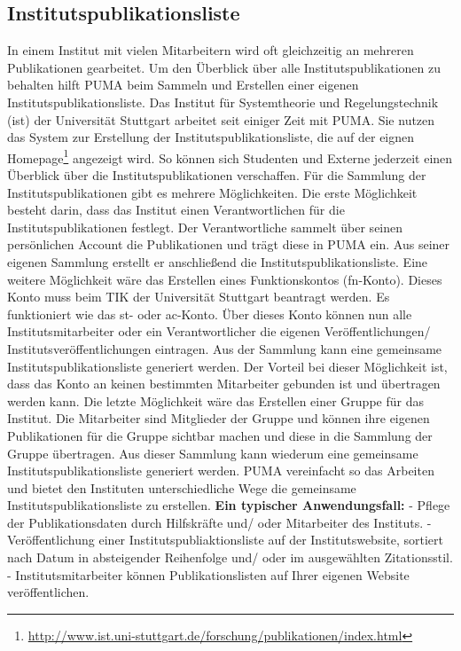 \subsection{Institutspublikationsliste}
In einem Institut mit vielen Mitarbeitern wird oft gleichzeitig an mehreren Publikationen gearbeitet. Um den Überblick über alle Institutspublikationen zu behalten hilft PUMA beim Sammeln und Erstellen einer eigenen Institutspublikationsliste. \newline
Das Institut für Systemtheorie und Regelungstechnik (ist) der Universität Stuttgart arbeitet seit einiger Zeit mit PUMA. Sie nutzen das System zur Erstellung der Institutspublikationsliste, die auf der eignen Homepage\footnote{\url{http://www.ist.uni-stuttgart.de/forschung/publikationen/index.html}} angezeigt wird. So können sich Studenten und Externe jederzeit einen Überblick über die Institutspublikationen verschaffen.\newline
Für die Sammlung der Institutspublikationen gibt es mehrere Möglichkeiten. Die erste Möglichkeit besteht darin, dass das Institut einen Verantwortlichen für  die Institutspublikationen festlegt. Der Verantwortliche sammelt über seinen persönlichen Account die Publikationen und trägt diese in PUMA ein. Aus seiner eigenen Sammlung erstellt er anschließend die Institutspublikationsliste. Eine weitere Möglichkeit wäre das Erstellen eines Funktionskontos (fn-Konto). Dieses Konto muss beim TIK der Universität Stuttgart beantragt werden. Es funktioniert wie das st- oder ac-Konto. Über dieses Konto können nun alle Institutsmitarbeiter oder ein Verantwortlicher die eigenen Veröffentlichungen/ Institutsveröffentlichungen eintragen. Aus der Sammlung kann eine gemeinsame Institutspublikationsliste generiert werden. Der Vorteil bei dieser Möglichkeit ist, dass das Konto an keinen bestimmten Mitarbeiter gebunden ist und übertragen werden kann. Die letzte Möglichkeit wäre das Erstellen einer Gruppe für das Institut. Die Mitarbeiter sind Mitglieder der Gruppe und können ihre eigenen Publikationen für die Gruppe sichtbar machen und diese in die Sammlung der Gruppe übertragen. Aus dieser  Sammlung kann wiederum eine gemeinsame Institutspublikationsliste generiert werden.\newline
PUMA vereinfacht so das Arbeiten und bietet den Instituten unterschiedliche Wege die gemeinsame Institutspublikationsliste zu erstellen.
\newline \newline
\textbf{Ein typischer Anwendungsfall:}\newline
- Pflege der Publikationsdaten durch Hilfskräfte und/ oder Mitarbeiter des Instituts.\newline
- Veröffentlichung einer Institutspubliaktionsliste auf der Institutswebsite, sortiert nach Datum in absteigender Reihenfolge und/ oder im ausgewählten Zitationsstil.\newline
- Institutsmitarbeiter können Publikationslisten auf Ihrer eigenen Website veröffentlichen.


